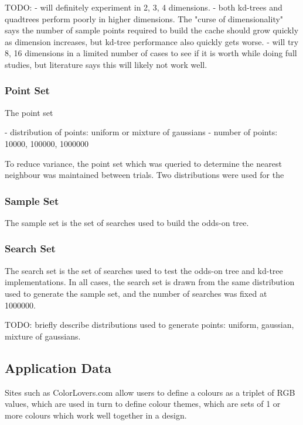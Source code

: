 \documentclass[mcs]{scsthesis}
\begin{document}
TODO:
- will definitely experiment in 2, 3, 4 dimensions.
- both kd-trees and quadtrees perform poorly in higher dimensions.  The "curse
of dimensionality" says the number of sample points required to build the cache
should grow quickly as dimension increases, but kd-tree performance also quickly
gets worse.
- will try 8, 16 dimensions in a limited number of cases to see if it is worth
while doing full studies, but literature says this will likely not work well.

\subsubsection{Point Set}

The point set

- distribution of points: uniform or mixture of gaussians
- number of points: 10000, 100000, 1000000 

To reduce variance, the point set which was queried to determine the nearest
neighbour was maintained between trials.  Two distributions were used for the

\subsubsection{Sample Set}

The sample set is the set of searches used to build the odds-on tree.

\subsubsection{Search Set}

The search set is the set of searches used to  test the odds-on tree and
kd-tree implementations.  In all cases, the search set is drawn from the same
distribution used to generate the sample set, and the number of searches was
fixed at 1000000. 

TODO: briefly describe distributions used to generate points: uniform, gaussian,
mixture of gaussians.

\subsection{Application Data}

Sites such as ColorLovers.com \cite{colorlovers} allow users to define a
colours as a triplet of RGB values, which are used in turn to define colour
themes, which are sets of 1 or more colours which work well together in a
design.
\end{document}
